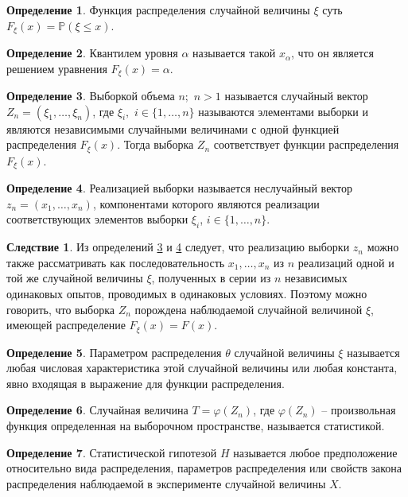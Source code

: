\documentclass[12pt]{article}
\theoremstyle{definition}
\newtheorem{definition}{Определение}
\newtheorem{consequence}{Следствие}[subsection]
\newcommand{\prob}{\mathbb{P}}
\begin{document}
\begin{definition}
    Функция распределения случайной величины $\xi$ суть $F_\xi(x)=\prob(\xi\leq x)$.
\end{definition}
\begin{definition}
    Квантилем уровня $\alpha$ называется такой $x_\alpha$, что он является решением уравнения $F_\xi(x)=\alpha$.
\end{definition}
\begin{definition}\label{выборка}
    Выборкой объема $n;\,\,n>1$ называется случайный вектор $Z_n=(\xi_1,\ldots,\xi_n)$, где $\xi_i,\,\,i\in\{1,\ldots,n\}$ называются элементами выборки и являются независимыми случайными величинами с одной функцией распределения $F_\xi(x)$. Тогда выборка $Z_n$ соответствует функции распределения $F_\xi(x)$.
\end{definition}
\begin{definition}\label{реализация выборки}
    Реализацией выборки называется неслучайный вектор $z_n=(x_1,\ldots,x_n)$, компонентами которого являются реализации соответствующих элементов выборки $\xi_i$, $i\in\{1,\ldots,n\}$.
\end{definition}
\begin{consequence}
    Из определений \ref{выборка} и \ref{реализация выборки} следует, что реализацию выборки $z_n$ можно также рассматривать как последовательность $x_1,\ldots,x_n$ из $n$ реализаций одной и той же случайной величины $\xi$, полученных в серии из $n$ независимых одинаковых опытов, проводимых в одинаковых условиях. Поэтому можно говорить, что выборка $Z_n$ порождена наблюдаемой случайной величиной $\xi$, имеющей распределение $F_\xi(x)=F(x)$.
\end{consequence}
\begin{definition}
    Параметром распределения $\theta$ случайной величины $\xi$ называется любая числовая характеристика этой случайной величины или любая константа, явно входящая в выражение для функции распределения.
\end{definition}
\begin{definition}
    Случайная величина $T=\varphi(Z_n)$, где $\varphi(Z_n)$ – произвольная функция определенная на выборочном пространстве, называется статистикой.
\end{definition}
\begin{definition}
    Статистической гипотезой $H$ называется любое предположение относительно вида распределения, параметров распределения или свойств закона распределения наблюдаемой в эксперименте случайной величины $X$.
\end{definition}
\end{document}
